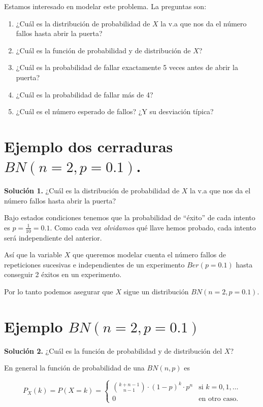 \documentclass[
  letterpaper,
  DIV=11,
  numbers=noendperiod]{scrreprt}
\providecommand{\tightlist}{%
  \setlength{\itemsep}{0pt}\setlength{\parskip}{0pt}}\usepackage{longtable,booktabs,array}
\begin{document}
Estamos interesado en modelar este problema. La preguntas son:

\begin{enumerate}
\def\labelenumi{\arabic{enumi}.}
\tightlist
\item
  ¿Cuál es la distribución de probabilidad de \(X\) la v.a que nos da el
  número fallos hasta abrir la puerta?
\item
  ¿Cuál es la función de probabilidad y de distribución de \(X\)?
\item
  ¿Cuál es la probabilidad de fallar exactamente 5 veces antes de abrir
  la puerta?
\item
  ¿Cuál es la probabilidad de fallar más de 4?
\item
  ¿Cuál es el número esperado de fallos? ¿Y su desviación típica?
\end{enumerate}

\section{\texorpdfstring{Ejemplo dos cerraduras
\(BN(n=2,p=0.1)\).}{Ejemplo dos cerraduras BN(n=2,p=0.1).}}\label{ejemplo-dos-cerraduras-bnn2p0.1.}

\textbf{Solución 1.} ¿Cuál es la distribución de probabilidad de \(X\)
la v.a que nos da el número fallos hasta abrir la puerta?

Bajo estados condiciones tenemos que la probabilidad de ``éxito'' de
cada intento es \(p=\frac{1}{10}=0.1\). Como cada vez \emph{olvidamos}
qué llave hemos probado, cada intento será independiente del anterior.

Así que la variable \(X\) que queremos modelar cuenta el número fallos
de repeticiones sucesivas e independientes de un experimento
\(Ber(p=0.1)\) hasta conseguir 2 éxitos en un experimento.

Por lo tanto podemos asegurar que \(X\) sigue un distribución
\(BN(n=2,p=0.1).\)

\section{\texorpdfstring{Ejemplo
\(BN(n=2,p=0.1)\)}{Ejemplo BN(n=2,p=0.1)}}\label{ejemplo-bnn2p0.1}

\textbf{Solución 2.} ¿Cuál es la función de probabilidad y de
distribución del \(X\)?

En general la función de probabilidad de una \(BN(n,p)\) es

\[
P_X(k)=P(X=k)=
\left\{
\begin{array}{cc} 
{k+n-1\choose n-1} \cdot (1-p)^{k}\cdot p^n & \mbox{si }  k=0,1,\ldots \\ 0 & \mbox{en otro caso.}\end{array}\right.
\]
\end{document}
